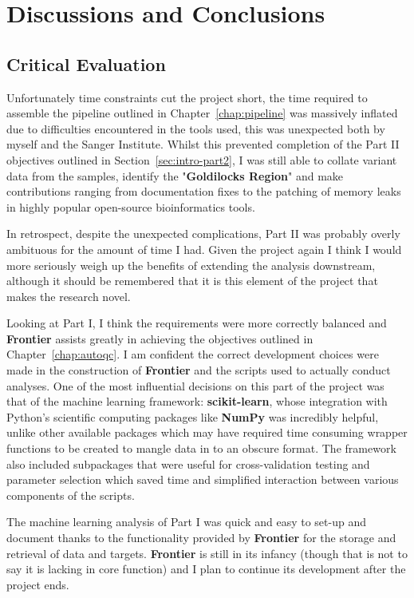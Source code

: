 \part{Discussions and Conclusions}

\chapter{Critical Evaluation}

Unfortunately time constraints cut the project short, the time required to
assemble the pipeline outlined in Chapter~\ref{chap:pipeline}
was massively inflated due to difficulties encountered in the tools used,
this was unexpected both by myself and the Sanger Institute.
Whilst this prevented completion of the Part II objectives outlined in
Section~\ref{sec:intro-part2}, I was still able to collate variant data from the
samples, identify the "\textbf{Goldilocks Region}" and make contributions
ranging from documentation fixes to the patching of memory leaks in
highly popular open-source bioinformatics tools.

In retrospect, despite the unexpected complications, Part II was probably overly
ambituous for the amount of time I had. Given the project again I think I would
more seriously weigh up the benefits of extending the analysis downstream,
although it should be remembered that it is this element of the project that
makes the research novel.

Looking at Part I, I think the requirements were more correctly balanced and
\textbf{Frontier} assists greatly in achieving the objectives outlined in
Chapter~\ref{chap:autoqc}. I am confident the correct development choices were
made in the construction of \textbf{Frontier} and the scripts used to actually
conduct analyses. One of the most influential decisions on this part of the
project was that of the machine learning framework: \textbf{scikit-learn}, whose
integration with Python's scientific computing packages like \textbf{NumPy} was
incredibly helpful, unlike other available packages which may have required time
consuming wrapper functions to be created to mangle data in to an obscure
format. The framework also included subpackages that were useful for
cross-validation testing and parameter selection which saved time and simplified
interaction between various components of the scripts.

The machine learning analysis of Part I was quick and easy to set-up and
document thanks to the functionality provided by \textbf{Frontier} for the
storage and retrieval of data and targets. \textbf{Frontier} is still in its
infancy (though that is not to say it is lacking in core function) and I plan to
continue its development after the project ends.

